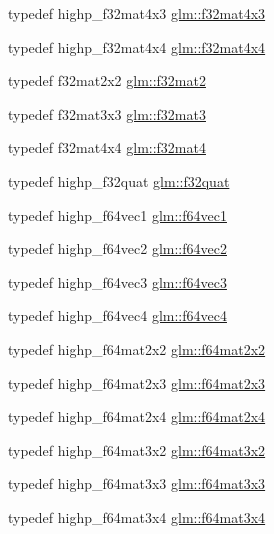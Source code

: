 \begin{DoxyCompactItemize}
\item 
typedef highp\-\_\-f32mat4x3 \hyperlink{group__gtc__type__precision_ga5102ae88531e072efe57e75354e10347}{glm\-::f32mat4x3}
\item 
typedef highp\-\_\-f32mat4x4 \hyperlink{group__gtc__type__precision_ga939fc7fbeb62575aca543d3a0342d807}{glm\-::f32mat4x4}
\item 
typedef f32mat2x2 \hyperlink{group__gtc__type__precision_ga5a8b82f5ef3eb6355640d57466793d9b}{glm\-::f32mat2}
\item 
typedef f32mat3x3 \hyperlink{group__gtc__type__precision_gaf8d666dea6f652c21f0c1515ce522090}{glm\-::f32mat3}
\item 
typedef f32mat4x4 \hyperlink{group__gtc__type__precision_ga6bf98d2ab0eb4889e5190c26e1853292}{glm\-::f32mat4}
\item 
typedef highp\-\_\-f32quat \hyperlink{group__gtc__type__precision_gafc69e0f1b9ac1a001bb4b1b9710d4f92}{glm\-::f32quat}
\item 
typedef highp\-\_\-f64vec1 \hyperlink{group__gtc__type__precision_ga55bdb96a24de2e3531c74310b12ba5d7}{glm\-::f64vec1}
\item 
typedef highp\-\_\-f64vec2 \hyperlink{group__gtc__type__precision_ga3f131d462df8154918f93ba1ac7cc4bd}{glm\-::f64vec2}
\item 
typedef highp\-\_\-f64vec3 \hyperlink{group__gtc__type__precision_ga794ee8f0a105cda01946cd9860f492a8}{glm\-::f64vec3}
\item 
typedef highp\-\_\-f64vec4 \hyperlink{group__gtc__type__precision_gac10d088c5f1d16a62fb019408af34e1b}{glm\-::f64vec4}
\item 
typedef highp\-\_\-f64mat2x2 \hyperlink{group__gtc__type__precision_gad125d405392e76f26f359798350fb64f}{glm\-::f64mat2x2}
\item 
typedef highp\-\_\-f64mat2x3 \hyperlink{group__gtc__type__precision_ga5b665390818b04bdd95bb6b2a25e5c2c}{glm\-::f64mat2x3}
\item 
typedef highp\-\_\-f64mat2x4 \hyperlink{group__gtc__type__precision_ga7f84d2c51081d56599a45c01d67ac155}{glm\-::f64mat2x4}
\item 
typedef highp\-\_\-f64mat3x2 \hyperlink{group__gtc__type__precision_gae6388c7664b5bb281047a9fd7984f97b}{glm\-::f64mat3x2}
\item 
typedef highp\-\_\-f64mat3x3 \hyperlink{group__gtc__type__precision_gad74db0197015b8d1d77ce54cf8d0ae60}{glm\-::f64mat3x3}
\item 
typedef highp\-\_\-f64mat3x4 \hyperlink{group__gtc__type__precision_gac9468e5fa519d06b452d3126bb22a597}{glm\-::f64mat3x4}

\end{DoxyCompactItemize}
